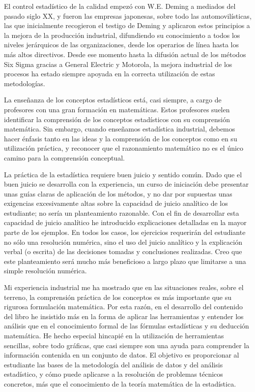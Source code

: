 \documentclass[
  letterpaper,
  DIV=11,
  numbers=noendperiod,
  oneside]{scrreprt}
\begin{document}
El control estadístico de la calidad empezó con W.E. Deming a mediados
del pasado siglo XX, y fueron las empresas japonesas, sobre todo las
automovilísticas, las que inicialmente recogieron el testigo de Deming y
aplicaron estos principios a la mejora de la producción industrial,
difundiendo su conocimiento a todos los niveles jerárquicos de las
organizaciones, desde los operarios de línea hasta los más altos
directivos. Desde ese momento hasta la difusión actual de los métodos
Six Sigma gracias a General Electric y Motorola, la mejora industrial de
los procesos ha estado siempre apoyada en la correcta utilización de
estas metodologías.

La enseñanza de los conceptos estadísticos está, casi siempre, a cargo
de profesores con una gran formación en matemáticas. Estos profesores
suelen identificar la comprensión de los conceptos estadísticos con su
comprensión matemática. Sin embargo, cuando enseñamos estadística
industrial, debemos hacer énfasis tanto en las ideas y la comprensión de
los conceptos como en su utilización práctica, y reconocer que el
razonamiento matemático no es el único camino para la comprensión
conceptual.

La práctica de la estadística requiere buen juicio y sentido común. Dado
que el buen juicio se desarrolla con la experiencia, un curso de
iniciación debe presentar unas guías claras de aplicación de los
métodos, y no dar por supuestas unas exigencias excesivamente altas
sobre la capacidad de juicio analítico de los estudiante; no sería un
planteamiento razonable. Con el fin de desarrollar esta capacidad de
juicio analítico he introducido explicaciones detalladas en la mayor
parte de los ejemplos. En todos los casos, los ejercicios requerirán del
estudiante no sólo una resolución numérica, sino el uso del juicio
analítico y la explicación verbal (o escrita) de las decisiones tomadas
y conclusiones realizadas. Creo que este planteamiento será mucho más
beneficioso a largo plazo que limitarse a una simple resolución
numérica.

Mi experiencia industrial me ha mostrado que en las situaciones reales,
sobre el terreno, la comprensión práctica de los conceptos es más
importante que su rigurosa formulación matemática. Por esta razón, en el
desarrollo del contenido del libro he insistido más en la forma de
aplicar las herramientas y entender los análisis que en el conocimiento
formal de las fórmulas estadísticas y su deducción matemática. He hecho
especial hincapié en la utilización de herramientas sencillas, sobre
todo gráficas, que casi siempre son una ayuda para comprender la
información contenida en un conjunto de datos. El objetivo es
proporcionar al estudiante las bases de la metodología del análisis de
datos y del análisis estadístico, y cómo puede aplicarse a la resolución
de problemas técnicos concretos, más que el conocimiento de la teoría
matemática de la estadística.
\end{document}
